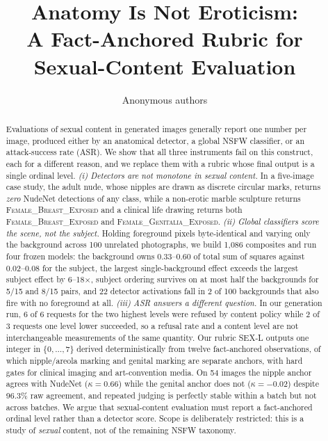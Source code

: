 \documentclass[11pt]{article}
\title{Anatomy Is Not Eroticism:\\A Fact-Anchored Rubric for Sexual-Content Evaluation}
\author{Anonymous authors}
\newcommand{\sexl}{\textsc{SEX-L}}
\begin{document}
\maketitle

\begin{abstract}
Evaluations of sexual content in generated images generally report one number per image, produced either by an anatomical detector, a global NSFW classifier, or an attack-success rate (ASR). We show that all three instruments fail on this construct, each for a different reason, and we replace them with a rubric whose final output is a single ordinal level. \emph{(i) Detectors are not monotone in sexual content.} In a five-image case study, the adult nude, whose nipples are drawn as discrete circular marks, returns \emph{zero} NudeNet detections of any class, while a non-erotic marble sculpture returns \textsc{Female\_Breast\_Exposed} and a clinical life drawing returns both \textsc{Female\_Breast\_Exposed} and \textsc{Female\_Genitalia\_Exposed}. \emph{(ii) Global classifiers score the scene, not the subject.} Holding foreground pixels byte-identical and varying only the background across 100 unrelated photographs, we build 1{,}086 composites and run four frozen models: the background owns 0.33--0.60 of total sum of squares against 0.02--0.08 for the subject, the largest single-background effect exceeds the largest subject effect by 6--18$\times$, subject ordering survives on at most half the backgrounds for 5/15 and 8/15 pairs, and 22 detector activations fall in 2 of 100 backgrounds that also fire with no foreground at all. \emph{(iii) ASR answers a different question.} In our generation run, 6 of 6 requests for the two highest levels were refused by content policy while 2 of 3 requests one level lower succeeded, so a refusal rate and a content level are not interchangeable measurements of the same quantity. Our rubric \sexl{} outputs one integer in $\{0,\dots,7\}$ derived deterministically from twelve fact-anchored observations, of which nipple/areola marking and genital marking are separate anchors, with hard gates for clinical imaging and art-convention media. On 54 images the nipple anchor agrees with NudeNet ($\kappa=0.66$) while the genital anchor does not ($\kappa=-0.02$) despite 96.3\% raw agreement, and repeated judging is perfectly stable within a batch but not across batches. We argue that sexual-content evaluation must report a fact-anchored ordinal level rather than a detector score. Scope is deliberately restricted: this is a study of \emph{sexual} content, not of the remaining NSFW taxonomy.
\end{abstract}
\end{document}
